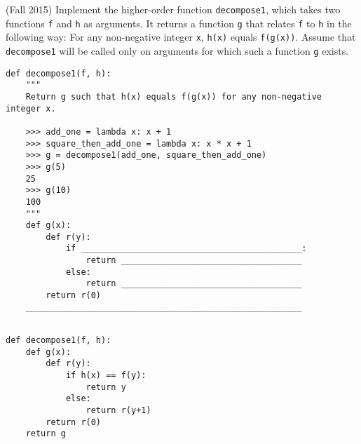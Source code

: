\begin{blocksection}
\question (Fall 2015) Implement the higher-order function \lstinline$decompose1$, 
which takes two functions \lstinline$f$ and \lstinline$h$ as arguments. It returns a function
\lstinline$g$ that relates \lstinline$f$ to \lstinline$h$ in the following way: For any 
non-negative integer \lstinline$x$, \lstinline$h(x)$ equals \lstinline$f(g(x))$. Assume that 
\lstinline$decompose1$ will be called only on arguments for which such a function 
\lstinline$g$ exists. \\

\begin{lstlisting}
def decompose1(f, h):
    """
    Return g such that h(x) equals f(g(x)) for any non-negative integer x.
    
    >>> add_one = lambda x: x + 1
    >>> square_then_add_one = lambda x: x * x + 1
    >>> g = decompose1(add_one, square_then_add_one)
    >>> g(5)
    25
    >>> g(10)
    100
    """
    def g(x):
        def r(y):
            if ____________________________________________:
                return ____________________________________
            else:
                return ____________________________________
        return r(0)
    _______________________________________________________
    
\end{lstlisting}

\begin{solution}[1.5in]
\begin{lstlisting}
def decompose1(f, h):
    def g(x):
        def r(y):
            if h(x) == f(y):
                return y
            else:
                return r(y+1)
        return r(0)
    return g
\end{lstlisting}
\end{solution}
\end{blocksection}
